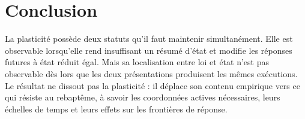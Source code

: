 \section{Conclusion}
\label{annexe-K-conclusion}

La plasticité possède deux statuts qu'il faut maintenir simultanément.
Elle est observable lorsqu'elle rend insuffisant un résumé d'état et
modifie les réponses futures à état réduit égal. Mais sa localisation
entre loi et état n'est pas observable dès lors que les deux
présentations produisent les mêmes exécutions. Le résultat ne dissout pas
la plasticité : il déplace son contenu empirique vers ce qui résiste au
rebaptême, à savoir les coordonnées actives nécessaires, leurs échelles
de temps et leurs effets sur les frontières de réponse.
